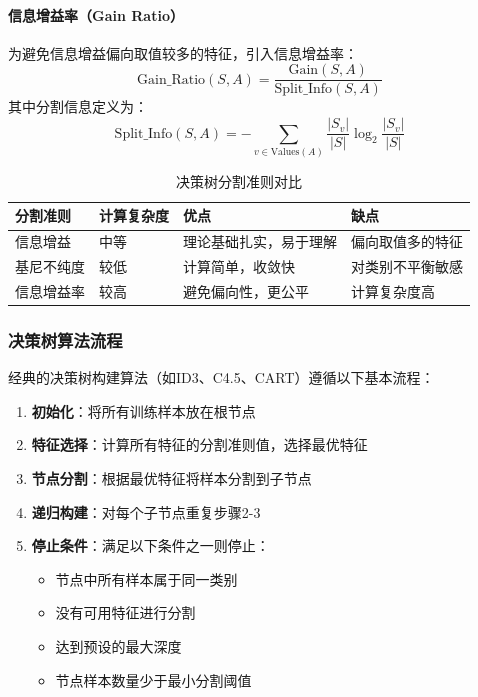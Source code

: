 \documentclass[UTF8]{report}
\theoremstyle{MyLineTheoremStyle} %
\theoremstyle{MyBlockTheoremStyle} %
\theoremstyle{MySubsubsectionStyle} %
\begin{document}
\paragraph{信息增益率（Gain Ratio）}
为避免信息增益偏向取值较多的特征，引入信息增益率：
\begin{equation}
\text{Gain\_Ratio}(S, A) = \frac{\text{Gain}(S, A)}{\text{Split\_Info}(S, A)}
\end{equation}
其中分割信息定义为：
\begin{equation}
\text{Split\_Info}(S, A) = -\sum_{v \in \text{Values}(A)} \frac{|S_v|}{|S|} \log_2 \frac{|S_v|}{|S|}
\end{equation}

\begin{table}[h]
\centering
\caption{决策树分割准则对比}
\begin{tabular}{l p{3cm} p{4cm} p{3cm}}
\toprule
\textbf{分割准则} & \textbf{计算复杂度} & \textbf{优点} & \textbf{缺点} \\
\midrule
信息增益 & 中等 & 理论基础扎实，易于理解 & 偏向取值多的特征 \\
基尼不纯度 & 较低 & 计算简单，收敛快 & 对类别不平衡敏感 \\
信息增益率 & 较高 & 避免偏向性，更公平 & 计算复杂度高 \\
\bottomrule
\end{tabular}
\end{table}

\subsubsection{决策树算法流程}

经典的决策树构建算法（如ID3、C4.5、CART）遵循以下基本流程：

\begin{enumerate}[label=\arabic*.]
    \item \textbf{初始化}：将所有训练样本放在根节点
    \item \textbf{特征选择}：计算所有特征的分割准则值，选择最优特征
    \item \textbf{节点分割}：根据最优特征将样本分割到子节点
    \item \textbf{递归构建}：对每个子节点重复步骤2-3
    \item \textbf{停止条件}：满足以下条件之一则停止：
        \begin{itemize}
            \item 节点中所有样本属于同一类别
            \item 没有可用特征进行分割
            \item 达到预设的最大深度
            \item 节点样本数量少于最小分割阈值
        \end{itemize}
\end{enumerate}
\end{document}

